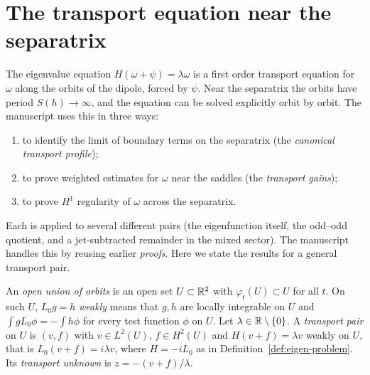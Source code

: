\chapter{The transport equation near the separatrix}
\label{chap:transport}

The eigenvalue equation $H(\omega+\psi)=\lambda\omega$ is a first order
transport equation for $\omega$ along the orbits of the dipole, forced by
$\psi$. Near the separatrix the orbits have period $S(h)\to\infty$, and the
equation can be solved explicitly orbit by orbit. The manuscript uses this in
three ways:
\begin{enumerate}
  \item to identify the limit of boundary terms on the separatrix (the
        \emph{canonical transport profile});
  \item to prove weighted estimates for $\omega$ near the saddles (the
        \emph{transport gains});
  \item to prove $H^1$ regularity of $\omega$ across the separatrix.
\end{enumerate}
Each is applied to several different pairs (the eigenfunction itself, the
odd--odd quotient, and a jet-subtracted remainder in the mixed sector). The
manuscript handles this by reusing earlier \emph{proofs}. Here we state the
results for a general transport pair.

\begin{definition}
\label{def:transport-pair}
\leanok
An \emph{open union of orbits} is an open set $U\subset\mathbb{R}^2$ with
$\varphi_t(U)\subset U$ for all $t$. On such $U$, $L_0g=h$ \emph{weakly} means that
$g,h$ are locally integrable on $U$ and $\int gL_0\phi=-\int h\phi$ for every test
function $\phi$ on $U$. Let $\lambda\in\mathbb{R}\setminus\{0\}$. A \emph{transport pair} on
$U$ is $(v,f)$ with $v\in L^2(U)$, $f\in H^2(U)$ and $H(v+f)=\lambda v$ weakly on $U$,
that is $L_0(v+f)=i\lambda v$, where $H=-iL_0$ as in
Definition~\ref{def:eigen-problem}. Its \emph{transport unknown} is
$z=-(v+f)/\lambda$.
\end{definition}

